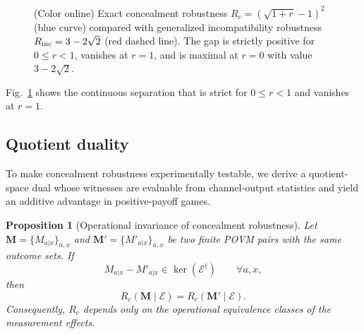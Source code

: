 \documentclass[
aps,pra,twocolumn,10pt,
superscriptaddress,longbibliography,floatfix
]{revtex4-2}
\newtheorem{proposition}[theorem]{Proposition}
\begin{document}
\begin{figure}[!t]
\centering
{}
\caption{
(Color online) Exact concealment robustness
$R_c=(\sqrt{1+r}-1)^2$ (blue curve) compared with generalized
incompatibility robustness
$R_{\rm inc}=3-2\sqrt2$ (red dashed line).
The gap is strictly positive for $0\le r<1$, vanishes at $r=1$,
and is maximal at $r=0$ with value $3-2\sqrt2$.
}
\label{fig:robustness_comparison}
\end{figure}

Fig.~\ref{fig:robustness_comparison} shows the continuous separation that is strict for \(0\le r<1\) and vanishes at \(r=1\).

\subsection{Quotient duality}

To make concealment robustness experimentally testable, we derive a quotient-space dual whose witnesses are evaluable from channel-output statistics and yield an additive advantage in positive-payoff games.

\begin{proposition}[Operational invariance of concealment robustness]
\label{prop:robustness_quotient_invariance}
Let $\mathbf M=\{M_{a|x}\}_{a,x}$ and $\mathbf M'=\{M'_{a|x}\}_{a,x}$ be two finite POVM pairs with the same outcome sets. If
\[
M_{a|x}-M'_{a|x}\in\ker(\mathcal E^\dagger)
\qquad
\forall a,x,
\]
then
\[
R_c(\mathbf M\mid\mathcal E)
=
R_c(\mathbf M'\mid\mathcal E).
\]
Consequently, $R_c$ depends only on the operational equivalence classes of the measurement effects.
\end{proposition}
\end{document}
